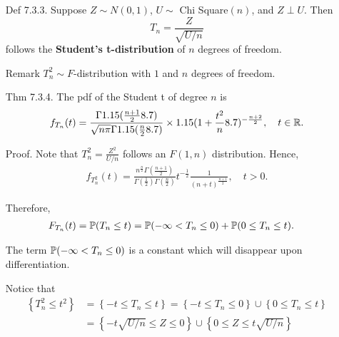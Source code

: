 \begin{frame}
\begin{enumerate}
\item[Def \small 7.3.3.] Suppose $Z\sim N(0,1)$, $U\sim$ Chi Square$(n)$, and $Z\perp U$.
Then
\[
T_n = \frac{Z}{\sqrt{U/n}}
\]
follows the \textcolor{yellow!80!black}{\bf Student's t-distribution} of $n$ degrees of freedom.
\vfill
\item[Remark] $T^2_n \sim F$-distribution with $1$ and $n$ degrees of freedom.
\vfill
\item[Thm \small 7.3.4.] The pdf of the Student t of degree $n$ is
\[
f_{T_n}(t) = \frac{\Gamma1.15(\frac{n+1}{2} 8.7)}{\sqrt{n\pi}\Gamma1.15(\frac{n}{2} 8.7)} \times 1.15(1+\frac{t^2}{n} 8.7)^{-\frac{n+2}{2}}, \quad t\in\mathbb{R}.
\]
\end{enumerate}
\end{frame}
\begin{frame}[fragile]
\begin{itemize}
	\item[Proof.] Note that $T_n^2=\frac{Z^2}{U/n}$ follows an $F(1,n)$ distribution. Hence,
		\begin{align*}
			f_{T_n^2} (t) = \frac{n^{\frac{n}{2}}\Gamma(\frac{n+1}{2})}{\Gamma(\frac{1}{2})\Gamma(\frac{n}{2})} t^{-\frac{1}{2}} \frac{1}{(n+t)^{\frac{n+1}{2} }},\quad t> 0.
		\end{align*}
		\item[] Therefore,
		\begin{align*}
			F_{T_n}(t) & = \mathbb{P}(T_n\le t)  = \mathbb{P}(-\infty< T_n\le 0) + \mathbb{P}(0\le T_n\le t).
		\end{align*}
		\item[] The term $\mathbb{P}(-\infty< T_n\le 0)$ is a constant which will disappear upon differentiation.
		\item[] Notice that
		\begin{align*}
			\left\{T_n^2 \le t^2 \right\} & = \left\{-t \le T_n \le t\right\} = \left\{-t\le T_n \le 0\right\} \cup \left\{0\le T_n\le t\right\}\\
                                    & = \left\{-t \sqrt{U/n}\le Z \le 0\right\} \cup \left\{0\le Z\le t\sqrt{U/n}\right\}
		\end{align*}
\end{itemize}
\end{frame}
